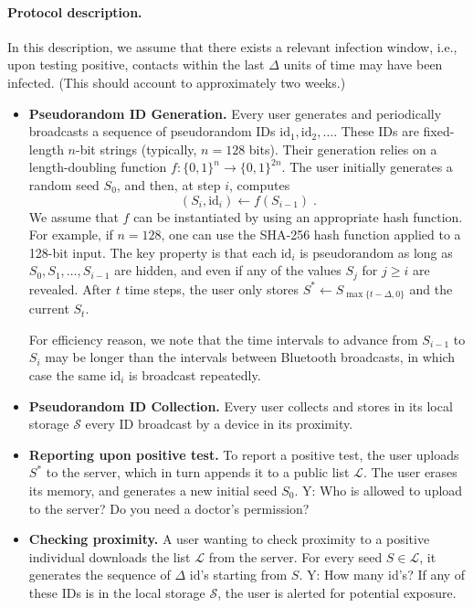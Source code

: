 \documentclass{article}
\newcommand{\TODO}[1]{ {\color{blue} #1 }}
\begin{document}
\paragraph{Protocol description.} In this description, we assume that there exists a relevant infection window, i.e., upon testing positive, contacts within the last $\Delta$ units of time may have been infected. (This should account to approximately two weeks.)

\newcommand{\id}{\mathrm{id}}
\begin{itemize}
    \item {\bf Pseudorandom ID Generation.} Every user generates and periodically broadcasts a sequence of pseudorandom IDs $\id_1, \id_2, \ldots$. These IDs are fixed-length $n$-bit strings (typically, $n = 128$ bits). Their generation relies on a length-doubling function $f: \{0,1\}^n \to \{0,1\}^{2n}$. The user initially generates a random seed $S_0$, and then, at step $i$, computes
\begin{displaymath}
(S_i, \id_i) \gets f(S_{i-1}) \;.
\end{displaymath}
We assume that $f$ can be instantiated by using an appropriate hash function. For example, if $n = 128$, one can use the SHA-256 hash function applied to a 128-bit input. The key property is that each $\id_i$ is pseudorandom  as long as $S_0, S_1, \ldots, S_{i-1}$ are hidden, and even if any of the values $S_j$ for $j \geq i$ are revealed. After $t$ time steps, the user only stores $S^* \gets S_{\max\{t-\Delta,0\}}$ and the current $S_t$. 

For efficiency reason, we note that the time intervals to advance from $S_{i-1}$ to $S_i$ may be longer than the intervals between Bluetooth broadcasts, in which case the same $\id_i$ is broadcast repeatedly. 
\item {\bf Pseudorandom ID Collection.} Every user  collects and stores in its local storage $\mathcal{S}$ every ID broadcast by a device in its proximity.
\item {\bf Reporting upon positive test.} To report a positive test, the user uploads $S^*$ to the server, which in turn appends it to a public list $\mathcal{L}$. The user erases its memory, and generates a new initial seed $S_0$. \TODO{Y: Who is allowed to upload to the server?  Do you need a doctor's permission? }
\item {\bf Checking proximity.} A user wanting to check proximity to a positive individual downloads the list $\mathcal{L}$ from the server. For every seed $S \in \mathcal{L}$, it generates the sequence of $\Delta$ $\id$'s starting from $S$. \TODO{Y:  How many id's?} If any of these IDs is in the local storage $\mathcal{S}$, the user is alerted for potential exposure.
\end{itemize}
\end{document}
